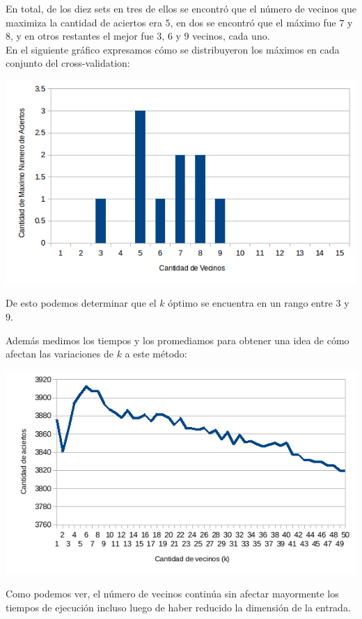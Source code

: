 En total, de los diez sets en tres de ellos se encontró que el número de vecinos que maximiza la cantidad de aciertos era $5$, en dos se encontró que el máximo fue $7$ y $8$, y en otros restantes el mejor fue $3$, $6$ y $9$ vecinos, cada uno.
\\
En el siguiente gráfico expresamos cómo se distribuyeron los máximos en cada conjunto del cross-validation:
\begin{center}
\includegraphics[scale=0.6]{nuevosResultados/pca/k/mejores.png}\\
\end{center}
De esto podemos determinar que el $k$ óptimo se encuentra en un rango entre $3$ y $9$.

Además medimos los tiempos y los promediamos para obtener una idea de cómo afectan las variaciones de $k$ a este método:
\begin{center}
\includegraphics[scale=0.6]{nuevosResultados/pca/k/temp.png}\\
\end{center}

Como podemos ver, el número de vecinos continúa sin afectar mayormente los tiempos de ejecución incluso luego de haber reducido la dimensión de la entrada.
